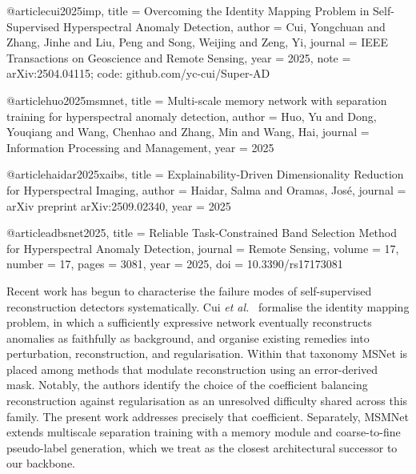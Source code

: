 

@article{cui2025imp,
  title   = {Overcoming the Identity Mapping Problem in Self-Supervised
             Hyperspectral Anomaly Detection},
  author  = {Cui, Yongchuan and Zhang, Jinhe and Liu, Peng and
             Song, Weijing and Zeng, Yi},
  journal = {IEEE Transactions on Geoscience and Remote Sensing},
  year    = {2025},
  note    = {arXiv:2504.04115; code: github.com/yc-cui/Super-AD}
}

@article{huo2025msmnet,
  title   = {Multi-scale memory network with separation training for
             hyperspectral anomaly detection},
  author  = {Huo, Yu and Dong, Youqiang and Wang, Chenhao and
             Zhang, Min and Wang, Hai},
  journal = {Information Processing and Management},
  year    = {2025}
}

@article{haidar2025xaibs,
  title   = {Explainability-Driven Dimensionality Reduction for
             Hyperspectral Imaging},
  author  = {Haidar, Salma and Oramas, Jos\'e},
  journal = {arXiv preprint arXiv:2509.02340},
  year    = {2025}
}

@article{adbsnet2025,
  title   = {Reliable Task-Constrained Band Selection Method for
             Hyperspectral Anomaly Detection},
  journal = {Remote Sensing},
  volume  = {17}, number = {17}, pages = {3081}, year = {2025},
  doi     = {10.3390/rs17173081}
}


Recent work has begun to characterise the failure modes of self-supervised
reconstruction detectors systematically. Cui \emph{et al.}~\cite{cui2025imp}
formalise the identity mapping problem, in which a sufficiently expressive
network eventually reconstructs anomalies as faithfully as background, and
organise existing remedies into perturbation, reconstruction, and
regularisation. Within that taxonomy MSNet is placed among methods that
modulate reconstruction using an error-derived mask. Notably, the authors
identify the choice of the coefficient balancing reconstruction against
regularisation as an unresolved difficulty shared across this family. The
present work addresses precisely that coefficient. Separately, MSMNet
\cite{huo2025msmnet} extends multiscale separation training with a memory
module and coarse-to-fine pseudo-label generation, which we treat as the
closest architectural successor to our backbone.

